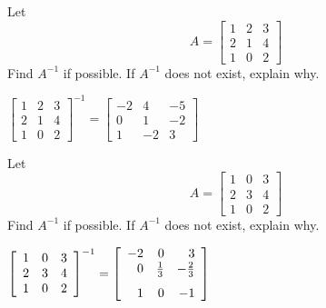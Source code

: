 \documentclass{ximera}
\begin{document}
\begin{problem}\label{prb:4.40}Let
\begin{equation*}
A=\left[
\begin{array}{rrr}
1 & 2 & 3 \\
2 & 1 & 4 \\
1 & 0 & 2
\end{array}
\right]
\end{equation*}
Find $A^{-1}$ if possible. If $A^{-1}$ does not exist, explain why.
\begin{hint}
$\left[
\begin{array}{ccc}
1 & 2 & 3 \\
2 & 1 & 4 \\
1 & 0 & 2
\end{array}
\right]^{-1}= \left[
\begin{array}{rrr}
-2 & 4 & -5 \\
0 & 1 & -2 \\
1 & -2 & 3
\end{array}
\right]$
\end{hint}
\end{problem}

\begin{problem}\label{prb:4.41}Let
\begin{equation*}
A=\left[
\begin{array}{rrr}
1 & 0 & 3 \\
2 & 3 & 4 \\
1 & 0 & 2
\end{array}
\right]
\end{equation*}
Find $A^{-1}$ if possible. If $A^{-1}$ does not exist, explain why.
\begin{hint}
$\left[
\begin{array}{ccc}
1 & 0 & 3 \\
2 & 3 & 4 \\
1 & 0 & 2
\end{array}
\right]^{-1}= \left[
\begin{array}{rrr}
-2 & 0 & 3 \\
0 & \vspace{0.05in}\frac{1}{3} & -\vspace{0.05in}\frac{2}{3} \\
1 & 0 & -1
\end{array}
\right]$
\end{hint}
\end{problem}
\end{document}
